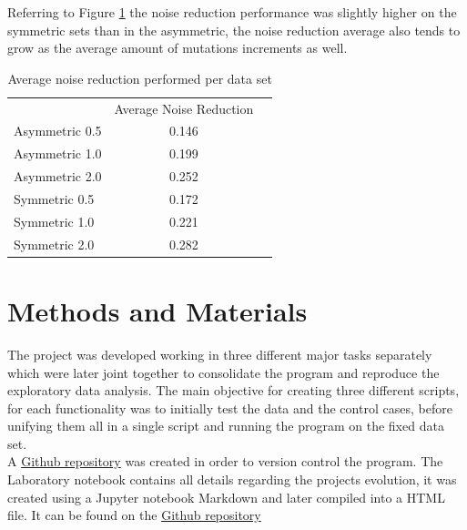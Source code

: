 \documentclass[12pt]{article}
\begin{document}
Referring to Figure \ref{table:averg} the noise reduction performance was slightly higher on the symmetric sets than in the asymmetric, the noise reduction average also tends to grow as the average amount of mutations increments as well.



\begin{table}[H]
	\centering
	\small\addtolength{\tabcolsep}{-5pt}
	\begin{tabular}{l|c|l}
		\cline{2-2}
		\textbf{} & \multicolumn{1}{l|}{Average Noise Reduction} &  \\ \cline{1-2}
		\multicolumn{1}{|l|}{Asymmetric 0.5} & 0.146 &  \\ \cline{1-2}
		\multicolumn{1}{|l|}{Asymmetric 1.0} & 0.199 &  \\ \cline{1-2}
		\multicolumn{1}{|l|}{Asymmetric 2.0} & 0.252 &  \\ \cline{1-2}
		\multicolumn{1}{|l|}{Symmetric 0.5} & 0.172 &  \\ \cline{1-2}
		\multicolumn{1}{|l|}{Symmetric 1.0} & 0.221 &  \\ \cline{1-2}
		\multicolumn{1}{|l|}{Symmetric 2.0} & 0.282 &  \\ \cline{1-2}
	\end{tabular}
\caption{Average noise reduction performed per data set}
\label{table:averg}
\end{table}


\section{Methods and Materials}
The project was developed  working in three different major tasks separately which were later joint together to consolidate the program and reproduce the exploratory data analysis. The main objective for creating three different scripts, for each functionality was to initially test the data and the control cases, before unifying them all in a single script and running the program on the fixed data set.\\

A \href{https://github.com/msarrias/protein_multial_noise_reduction}{Github repository} was created in order to version control the program. The Laboratory notebook contains all details regarding the projects evolution, it was created using a Jupyter notebook Markdown and later compiled into a HTML file. It can be found on the \href{https://github.com/msarrias/protein_multial_noise_reduction/tree/master/results}{Github repository} \\
\end{document}
